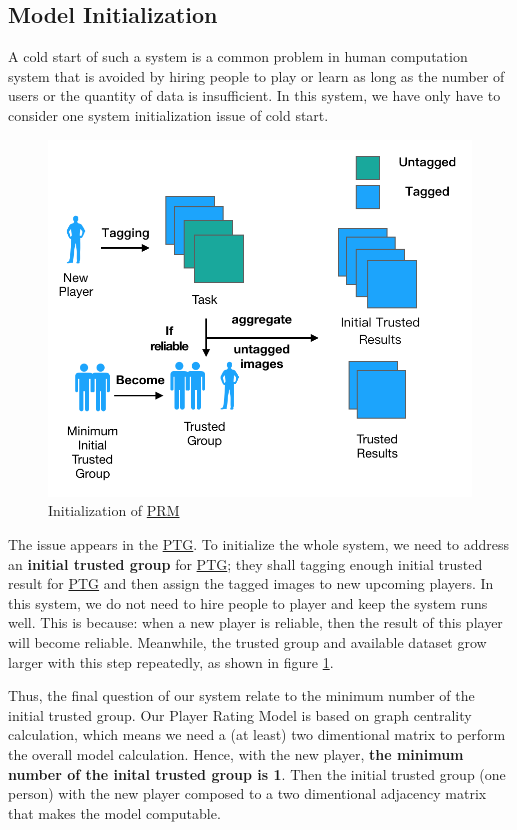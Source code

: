 \subsection{Model Initialization}
\label{chapter:modelinit}

A cold start of such a system is a common problem in human computation system that 
is avoided by hiring people to play or learn as long as 
the number of users or the quantity of data is insufficient.
In this system, we have only have to consider one system initialization issue of cold start.

\begin{figure}[htp]
\centering
\includegraphics[width=0.5\columnwidth]{figures/coldstart2}
\caption{Initialization of \hyperref[idx:prm]{PRM}}
\label{fig:cold}
\end{figure}

The issue appears in the \hyperref[idx:ptg]{PTG}. 
To initialize the whole system, we need to address an \textbf{initial trusted group} for \hyperref[idx:ptg]{PTG}; 
they shall tagging enough initial trusted result for \hyperref[idx:ptg]{PTG} and 
then assign the tagged images to new upcoming players. 
In this system, we do not need to hire people to player and keep the system runs well. This is because: 
when a new player is reliable, then the result of this player will become reliable. 
Meanwhile, the trusted group and available dataset grow larger with this step repeatedly, 
as shown in figure \ref{fig:cold}.

Thus, the final question of our system relate to the minimum number of the initial trusted group.
Our Player Rating Model is based on graph centrality calculation, which means we need a (at least) two dimentional matrix
to perform the overall model calculation. Hence, with the new player, \textbf{the minimum number of the inital trusted group is 1}.
Then the initial trusted group (one person) with the new player composed to a two dimentional adjacency matrix that makes the model
computable.